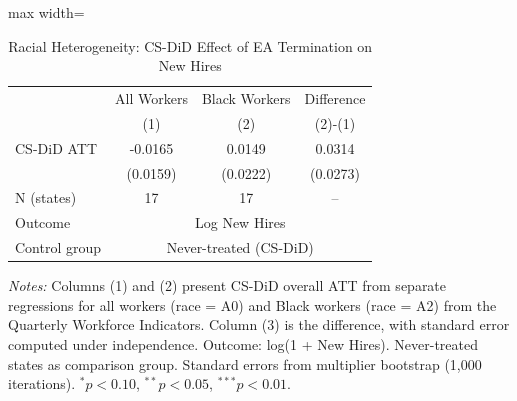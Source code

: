 \begin{table}[htbp]
\centering
\caption{Racial Heterogeneity: CS-DiD Effect of EA Termination on New Hires}
\label{tab:hetero}
\begin{adjustbox}{max width=\textwidth}
\begin{threeparttable}
\begin{tabular}{lccc}
\hline\hline
 & All Workers & Black Workers & Difference \\
 & (1) & (2) & (2)-(1) \\
\hline
CS-DiD ATT & -0.0165 & 0.0149 & 0.0314 \\
 & (0.0159) & (0.0222) & (0.0273) \\[4pt]
N (states) & 17 & 17 & -- \\
\hline
Outcome & \multicolumn{3}{c}{Log New Hires} \\
Control group & \multicolumn{3}{c}{Never-treated (CS-DiD)} \\
\hline\hline
\end{tabular}
\begin{tablenotes}[flushleft]
\footnotesize
\textit{Notes:} Columns (1) and (2) present CS-DiD overall ATT from separate regressions for all workers (race = A0) and Black workers (race = A2) from the Quarterly Workforce Indicators. Column (3) is the difference, with standard error computed under independence. Outcome: log(1 + New Hires). Never-treated states as comparison group. Standard errors from multiplier bootstrap (1,000 iterations). $^{*}p<0.10$, $^{**}p<0.05$, $^{***}p<0.01$.
\end{tablenotes}
\end{threeparttable}
\end{adjustbox}
\end{table}
